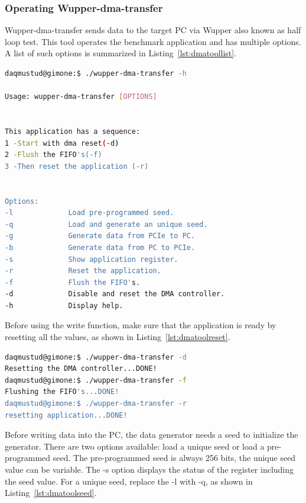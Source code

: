 \newpage

\subsubsection{Operating Wupper-dma-transfer}

Wupper-dma-transfer sends data to the target PC via Wupper also known as half loop test. This tool operates the benchmark application and has multiple options. A list of such options is summarized in Listing~\ref{lst:dmatoollist}.

\begin{lstlisting}[language=BASH, frame=single, label={lst:dmatoollist}, caption=Output of Wupper-dma-transfer -h]
daqmustud@gimone:$ ./wupper-dma-transfer -h

Usage: wupper-dma-transfer [OPTIONS]


This application has a sequence: 
1 -Start with dma reset(-d)
2 -Flush the FIFO's(-f)
3 -Then reset the application (-r)


Options:
-l             Load pre-programmed seed.
-q             Load and generate an unique seed.
-g             Generate data from PCIe to PC.
-b             Generate data from PC to PCIe.
-s             Show application register.
-r             Reset the application.
-f             Flush the FIFO's.
-d             Disable and reset the DMA controller.
-h             Display help.


\end{lstlisting}


 Before using the write function, make sure that the application is ready by resetting all the values, as shown in Listing~\ref{lst:dmatoolreset}.

\begin{lstlisting}[language=BASH, frame=single, label={lst:dmatoolreset},  caption=Reset Wupper before a DMA Write action]
daqmustud@gimone:$ ./wupper-dma-transfer -d
Resetting the DMA controller...DONE! 
daqmustud@gimone:$ ./wupper-dma-transfer -f
Flushing the FIFO's...DONE! 
daqmustud@gimone:$ ./wupper-dma-transfer -r
resetting application...DONE! 
\end{lstlisting}

\newpage

\noindent
Before writing data into the PC, the data generator needs a seed to initialize the generator. There are two options available: load a unique seed or load a pre-programmed seed. The pre-programmed seed is always 256 bits, the unique seed value can be variable. The -s option displays the status of the register including the seed value. For a unique seed, replace the -l with -q, as shown in Listing~\ref{lst:dmatoolseed}.

